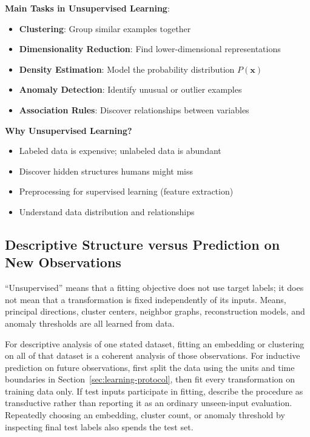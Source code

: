 \documentclass[11pt,twoside]{article}
\numberwithin{equation}{section}
\newcommand{\vect}[1]{\bm{#1}}
\theoremstyle{plain}
\theoremstyle{definition}
\theoremstyle{remark}
\newenvironment{keyidea}{
  \begin{tcolorbox}[colback=yellow!5!white,
                    colframe=yellow!50!black,
                    title=Key Idea,
                    breakable,
                    enhanced,
                    sharp corners,
                    boxrule=0.8pt,
                    left=6pt, right=6pt, top=6pt, bottom=6pt]
}{
  \end{tcolorbox}
}
\begin{document}
\begin{keyidea}
\textbf{Main Tasks in Unsupervised Learning}:

\begin{itemize}
\item \textbf{Clustering}: Group similar examples together
\item \textbf{Dimensionality Reduction}: Find lower-dimensional representations
\item \textbf{Density Estimation}: Model the probability distribution $P(\vect{x})$
\item \textbf{Anomaly Detection}: Identify unusual or outlier examples
\item \textbf{Association Rules}: Discover relationships between variables
\end{itemize}

\textbf{Why Unsupervised Learning?}
\begin{itemize}
\item Labeled data is expensive; unlabeled data is abundant
\item Discover hidden structures humans might miss
\item Preprocessing for supervised learning (feature extraction)
\item Understand data distribution and relationships
\end{itemize}
\end{keyidea}

\subsection{Descriptive Structure versus Prediction on New Observations}
\label{sec:unsupervised-protocol}
``Unsupervised'' means that a fitting objective does not use target labels; it does not mean that a transformation is fixed independently of its inputs. Means, principal directions, cluster centers, neighbor graphs, reconstruction models, and anomaly thresholds are all learned from data.

For descriptive analysis of one stated dataset, fitting an embedding or clustering on all of that dataset is a coherent analysis of those observations. For inductive prediction on future observations, first split the data using the units and time boundaries in Section~\ref{sec:learning-protocol}, then fit every transformation on training data only. If test inputs participate in fitting, describe the procedure as transductive rather than reporting it as an ordinary unseen-input evaluation. Repeatedly choosing an embedding, cluster count, or anomaly threshold by inspecting final test labels also spends the test set.
\end{document}
